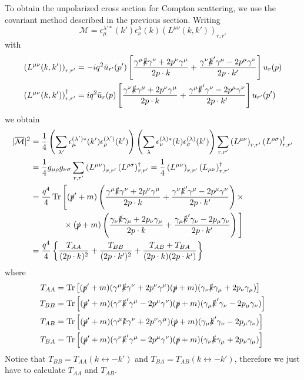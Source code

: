 \documentclass[TheoreticalPhy_ModB.tex]{subfiles}
\begin{document}
To obtain the unpolarized cross section for Compton scattering, we use the covariant method described in the previous section. Writing
\[\mathcal M=\epsilon_\mu^{\lambda'*}(k')\epsilon_\nu^\lambda(k)\left(L^{\mu\nu}(k,k')\right)_{r,r'}\]
with 
\[\begin{aligned}
\left(L^{\mu\nu}(k,k')\right)_{r,r'}&=-iq^2\bar u_{r'}(p')\left[\frac{\gamma^\mu\slashed k\gamma^\nu+2p^\nu\gamma^\mu }{2p\cdot k}+\frac{\gamma^\nu\slashed k'\gamma^\mu-2p^\mu\gamma^\nu }{2p\cdot k'}\right]u_r(p)\\
\left(L^{\mu\nu}(k,k')\right)_{r,r'}^\dagger&=iq^2\bar u_{r}(p)\left[\frac{\gamma^\nu\slashed k\gamma^\mu+2 p^\nu\gamma^\mu}{2p\cdot k}+\frac{\gamma^\mu\slashed k'\gamma^\nu-2 p^\mu\gamma^\nu}{2p\cdot k'}\right]u_{r'}(p')
\end{aligned}\]
we obtain
\begin{align*}
|\overline{\mathcal M}|^2&=\frac14\left(\sum_{\lambda'}\epsilon_\mu^{(\lambda')*}(k')\epsilon_\rho^{(\lambda')}(k')\right)\left(\sum_{\lambda}\epsilon_\nu^{(\lambda)*}(k)\epsilon_\sigma^{(\lambda)}(k')\right)\sum_{r,r'}\left(L^{\mu\nu}\right)_{r,r'}\left(L^{\rho\sigma}\right)^\dagger_{r,r'}\\
&=\frac14g_{\mu\rho}g_{\nu\sigma}\sum_{r,r'}\left(L^{\mu\nu}\right)_{r,r'}\left(L^{\rho\sigma}\right)^\dagger_{r,r'}
=\frac14\left(L^{\mu\nu}\right)_{r,r'}\left(L_{\mu\nu}\right)^\dagger_{r,r'}\\
&=\frac{q^4}4\Tr\Bigg[(\slashed p'+m)\left(\frac{\gamma^\mu\slashed k\gamma^\nu+2p^\nu\gamma^\mu }{2p\cdot k}+\frac{\gamma^\nu\slashed k'\gamma^\mu-2p^\mu\gamma^\nu }{2p\cdot k'}\right)\times\\
&\qquad\qquad\times(\slashed p+m)\left(\frac{\gamma_\nu\slashed k\gamma_\mu+2p_\nu\gamma_\mu }{2p\cdot k}+\frac{\gamma_\mu\slashed k'\gamma_\nu-2p_\mu\gamma_\nu }{2p\cdot k'}\right)\Bigg]\\
&=\frac{q^4}4\left\{\frac{T_{AA}}{(2p\cdot k)^2}+\frac{T_{BB}}{(2p\cdot k')^2}+\frac{T_{AB}+T_{BA}}{(2p\cdot k)(2p\cdot k')}\right\}
\end{align*}
where
\begin{align*}
T_{AA}&=\Tr\left[(\slashed p'+m)(\gamma^\mu\slashed k\gamma^\nu+2p^\nu\gamma^\mu)(\slashed p+m)(\gamma_\nu\slashed k\gamma_\mu+2p_\nu\gamma_\mu)\right]\\
T_{BB}&=\Tr\left[(\slashed p'+m)(\gamma^\nu\slashed k'\gamma^\mu-2p^\mu\gamma^\nu)(\slashed p+m)(\gamma_\mu\slashed k'\gamma_\nu-2p_\mu\gamma_\nu)\right]\\
T_{AB}&=\Tr\left[(\slashed p'+m)(\gamma^\mu\slashed k\gamma^\nu+2p^\nu\gamma^\mu)(\slashed p+m)(\gamma_\mu\slashed k'\gamma_\nu-2p_\mu\gamma_\nu)\right]\\
T_{BA}&=\Tr\left[(\slashed p'+m)(\gamma^\nu\slashed k'\gamma^\mu-2p^\mu\gamma^\nu)(\slashed p+m)(\gamma_\nu\slashed k\gamma_\mu+2p_\nu\gamma_\mu)\right]
\end{align*}
Notice that $T_{BB}=T_{AA}(k\leftrightarrow -k')$ and $T_{BA}=T_{AB}(k\leftrightarrow -k')$, therefore we just have to calculate $T_{AA}$ and $T_{AB}$.
\end{document}
